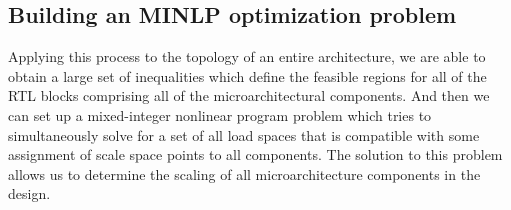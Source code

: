 \subsection{Building an MINLP optimization problem}

Applying this process to the topology of an entire architecture, we are able to obtain a large set of inequalities which define the feasible regions for all of the RTL blocks comprising all of the microarchitectural components. And then we can set up a mixed-integer nonlinear program problem which tries to simultaneously solve for a set of all load spaces that is compatible with some assignment of scale space points to all components. The solution to this problem allows us to determine the scaling of all microarchitecture components in the design.